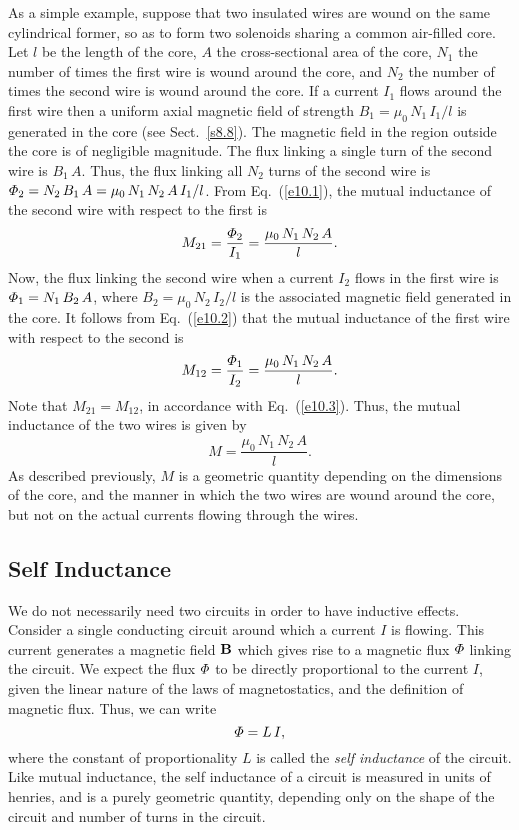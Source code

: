 As a simple example, suppose that two insulated wires are wound on the
same cylindrical former, so as to form two solenoids sharing  a common 
air-filled core. Let $l$ be the length of the core, $A$ the cross-sectional
area of the core, $N_1$ the number of times the first wire is
wound around the core, and $N_2$ the number of times the second wire is
wound around the core. If a current $I_1$ flows around the first
wire then a uniform axial magnetic field of strength $B_1 = \mu_0\,N_1\,I_1/l$
is generated in the core  (see Sect.~\ref{s8.8}). The magnetic
field in  the region outside the core  is of negligible
magnitude. The flux linking a single turn of the second wire is $B_1\,A$. Thus,
the flux linking all $N_2$ turns of the second wire is ${\mit\Phi}_{2}
= N_2\,B_1\,A = \mu_0\,N_1\,N_2\,A\,I_1/l$. From Eq.~(\ref{e10.1}), the mutual
inductance of the second wire with respect to the first is
\begin{equation}
M_{21}= \frac{{\mit\Phi}_{2}}{I_1} = \frac{\mu_0\,N_1\,N_2\,A}{l}.
\end{equation}
Now, the flux linking the second wire when a current $I_2$ flows in the
first wire is ${\mit\Phi}_{1} = N_1\,B_2\,A$, where $B_2 = \mu_0\,N_2\,I_2/l$
is the associated magnetic field generated in the core.
It follows from Eq.~(\ref{e10.2}) that the mutual inductance of the first  wire with respect to the second  is 
\begin{equation}
M_{12} =  \frac{{\mit\Phi}_{1}}{I_2} = \frac{\mu_0\,N_1\,N_2\,A}{l}.
\end{equation}
Note that $M_{21} = M_{12}$, in accordance with Eq.~(\ref{e10.3}). Thus,
the mutual inductance
of the two wires is given by
\begin{equation}\label{e10.10}
M = \frac{\mu_0\,N_1\,N_2\,A}{l}.
\end{equation}
As described previously,  $M$ is a geometric quantity depending on
the dimensions of the core, and the manner in which the two wires are
wound around the core, but not on the  actual currents flowing through
the wires.

\subsection{Self Inductance}\label{s10.2}
We do not necessarily need  two circuits in order to have inductive effects. Consider
a single conducting circuit around which a current $I$ is
flowing. This current generates a magnetic field ${\bf B}$ which
gives rise to a magnetic flux ${\mit\Phi}$ linking the
circuit.  We  expect the flux ${\mit\Phi}$ to be directly proportional
to the current $I$, given the linear nature of the laws of magnetostatics,
and the definition of magnetic flux. Thus, we can write
\begin{equation}\label{e10.11}
{\mit\Phi} = L\,I,
\end{equation}
where the constant of proportionality $L$ is called the {\em self inductance}\/ of the
circuit. Like mutual inductance, the self inductance
of a circuit is measured in units of henries, and is a
purely geometric quantity,  depending only on the
shape of the circuit and number of turns in the circuit. 


